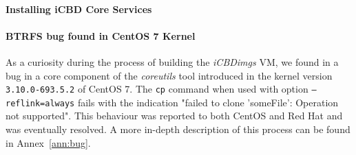 \paragraph{Installing iCBD Core Services}
\label{par:install_icbd_core}

\paragraph{BTRFS bug found in CentOS 7 Kernel}
\label{par:centos_bug}

As a curiosity during the process of building the \textit{iCBDimgs} VM, we found in a bug in a core component of the \textit{coreutils} tool introduced in the kernel version \texttt{3.10.0-693.5.2} of CentOS 7. The \texttt{cp} command when used with option \texttt{--reflink=always} fails with the indication "failed to clone 'someFile': Operation not supported". This behaviour was reported to both CentOS and Red Hat and was eventually resolved. A more in-depth description of this process can be found in Annex~\ref{ann:bug}.







